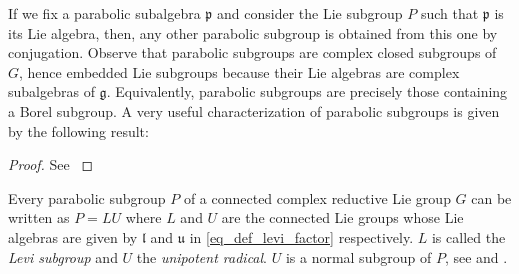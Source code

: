 If we fix a parabolic subalgebra \(\mathfrak{p}\) and consider the Lie subgroup \(P\) such that \(\mathfrak{p}\) is its Lie algebra, then, any other parabolic subgroup is obtained from this one by conjugation. Observe that parabolic subgroups are complex closed subgroups of \(G\), hence embedded Lie subgroups because their Lie algebras are complex subalgebras of \(\mathfrak{g}\). Equivalently, parabolic subgroups are precisely those containing a Borel subgroup. A very useful characterization of parabolic subgroups is given by the following result:

\begin{proof}
    See \parencite[Sec. 29.3]{humphreys1975linear}
\end{proof}

Every parabolic subgroup \(P\) of a connected complex reductive Lie group \(G\) can be written as \(P=LU\) where \(L\) and \(U\) are the connected Lie groups whose Lie algebras are given by \(\mathfrak{l}\) and \(\mathfrak{u}\) in \eqref{eq_def_levi_factor} respectively. \(L\) is called the \textit{Levi subgroup} and \(U\) the \textit{unipotent radical}. \(U\) is a normal subgroup of \(P\), see \parencite[Page 316]{bump2013lie} and \parencite[Sec. 2.1]{garcia2009hitchin}. 



